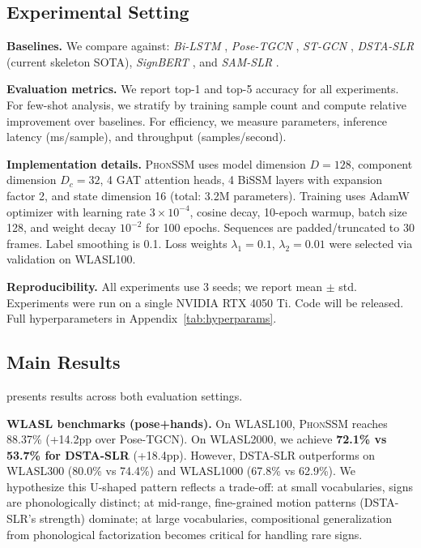 \documentclass{article}
\theoremstyle{definition}
\theoremstyle{remark}
\newcommand{\phonssm}{\textsc{PhonSSM}}
\begin{document}
\subsection{Experimental Setting}

\textbf{Baselines.} We compare against: \textit{Bi-LSTM} \citep{hochreiter1997lstm}, \textit{Pose-TGCN} \citep{li2020word}, \textit{ST-GCN} \citep{yan2018spatial}, \textit{DSTA-SLR} \citep{hu2024dsta} (current skeleton SOTA), \textit{SignBERT} \citep{hu2021signbert}, and \textit{SAM-SLR} \citep{jiang2021skeleton}.

\textbf{Evaluation metrics.} We report top-1 and top-5 accuracy for all experiments. For few-shot analysis, we stratify by training sample count and compute relative improvement over baselines. For efficiency, we measure parameters, inference latency (ms/sample), and throughput (samples/second).

\textbf{Implementation details.} \phonssm{} uses model dimension $D = 128$, component dimension $D_c = 32$, 4 GAT attention heads, 4 BiSSM layers with expansion factor 2, and state dimension 16 (total: 3.2M parameters). Training uses AdamW optimizer with learning rate $3 \times 10^{-4}$, cosine decay, 10-epoch warmup, batch size 128, and weight decay $10^{-2}$ for 100 epochs. Sequences are padded/truncated to 30 frames. Label smoothing is 0.1. Loss weights $\lambda_1 = 0.1$, $\lambda_2 = 0.01$ were selected via validation on WLASL100.

\textbf{Reproducibility.} All experiments use 3 seeds; we report mean $\pm$ std. Experiments were run on a single NVIDIA RTX 4050 Ti. Code will be released. Full hyperparameters in Appendix~\ref{tab:hyperparams}.


\subsection{Main Results}

 presents results across both evaluation settings.

\textbf{WLASL benchmarks (pose+hands).} On WLASL100, \phonssm{} reaches 88.37\% (+14.2pp over Pose-TGCN). On WLASL2000, we achieve \textbf{72.1\% vs 53.7\% for DSTA-SLR} (+18.4pp). However, DSTA-SLR outperforms on WLASL300 (80.0\% vs 74.4\%) and WLASL1000 (67.8\% vs 62.9\%). We hypothesize this U-shaped pattern reflects a trade-off: at small vocabularies, signs are phonologically distinct; at mid-range, fine-grained motion patterns (DSTA-SLR's strength) dominate; at large vocabularies, compositional generalization from phonological factorization becomes critical for handling rare signs.
\end{document}
